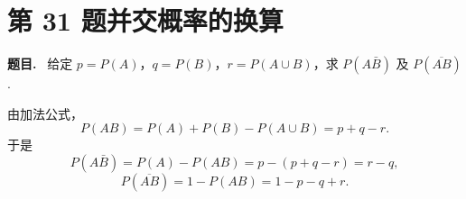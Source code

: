 \documentclass{article}
\newenvironment{problem}{\par\medskip\noindent\textbf{题目.}\ }{\par\smallskip}
\begin{document}
\section*{第 31 题\quad 并交概率的换算}

\begin{problem}
  给定 $p=P(A)$，$q=P(B)$，$r=P(A\cup B)$，求 $P(A\bar B)$ 及 $P(\overline{AB})$.
\end{problem}

\begin{solution}
  由加法公式，
  \[
    P(AB) = P(A) + P(B) - P(A\cup B) = p + q - r .
  \]
  于是
  \[
    P(A\bar B) = P(A) - P(AB) = p - (p+q-r) = r - q,
  \]
  \[
    P(\overline{AB}) = 1 - P(AB) = 1 - p - q + r .
  \]
\end{solution}
\end{document}
